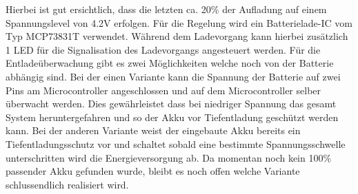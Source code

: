 Hierbei ist gut ersichtlich, dass die letzten ca. 20\% der Aufladung auf einem Spannungslevel von 4.2V erfolgen. Für die Regelung wird ein Batterielade-IC vom Typ MCP73831T verwendet.
Während dem Ladevorgang kann hierbei zusätzlich 1 LED für die Signalisation des Ladevorgangs angesteuert werden. Für die Entladeüberwachung gibt es zwei Möglichkeiten welche noch von der Batterie abhängig sind. Bei der einen Variante kann die Spannung der Batterie auf zwei Pins am Microcontroller angeschlossen und auf dem Microcontroller selber überwacht werden. Dies gewährleistet dass bei niedriger Spannung das gesamt System heruntergefahren und so der Akku vor Tiefentladung geschützt werden kann. Bei der anderen Variante weist der eingebaute Akku bereits ein Tiefentladungsschutz vor und schaltet sobald eine bestimmte Spannungsschwelle unterschritten wird die Energieversorgung ab. Da momentan noch kein 100$\%$ passender Akku gefunden wurde, bleibt es noch offen welche Variante schlussendlich realisiert wird.
